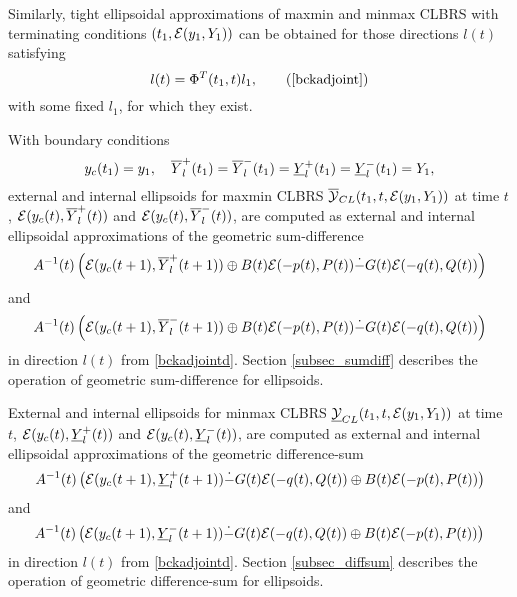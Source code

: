



Similarly, tight ellipsoidal approximations of maxmin and minmax CLBRS
with terminating conditions $(t_1, \EE(y_1,Y_1))$ can be obtained
for those directions $l(t)$ satisfying
\begin{equation}
l(t) = \Phi^T(t_1,t)l_1,
\tag*{(\ref{bckadjoint})}
\label{bckadjointd}
\end{equation}
with some fixed $l_1$, for which they exist.

With boundary conditions
\begin{equation}
y_c(t_1)=y_1, ~~~ \OYP(t_1)=\OYM(t_1)=\UYP(t_1)=\UYM(t_1)=Y_1,
\label{bndconds}
\end{equation}
external and internal ellipsoids for maxmin CLBRS $\OYCL(t_1,t,\EE(y_1,Y_1))$
at time $t$, $\EE(y_c(t),\OYP(t))$ and $\EE(y_c(t),\OYM(t))$, are computed
as external and internal ellipsoidal approximations of
the geometric sum-difference
\[ A^{-1}(t)\left(
\EE(y_c(t+1),\OYP(t+1)) \oplus B(t)\EE(-p(t),P(t))
\dot{-}G(t)\EE(-q(t),Q(t))
\right)\]
and
\[ A^{-1}(t)\left(
\EE(y_c(t+1),\OYM(t+1)) \oplus B(t)\EE(-p(t),P(t))
\dot{-}G(t)\EE(-q(t),Q(t))
\right)\]
in direction $l(t)$ from \ref{bckadjointd}.
Section \ref{subsec_sumdiff} describes the operation of
geometric sum-difference for ellipsoids.

External and internal ellipsoids for minmax CLBRS $\UYCL(t_1,t,\EE(y_1,Y_1))$
at time $t$, $\EE(y_c(t),\UYP(t))$ and $\EE(y_c(t),\UYM(t))$, are computed
as external and internal ellipsoidal approximations of
the geometric difference-sum
\[ A^{-1}(t)\left(
\EE(y_c(t+1),\UYP(t+1))
\dot{-}G(t)\EE(-q(t),Q(t))
\oplus B(t)\EE(-p(t),P(t))
\right)\]
and
\[ A^{-1}(t)\left(
\EE(y_c(t+1),\UYM(t+1))
\dot{-}G(t)\EE(-q(t),Q(t))
\oplus B(t)\EE(-p(t),P(t))
\right)\]
in direction $l(t)$ from \ref{bckadjointd}.
Section \ref{subsec_diffsum} describes the operation of
geometric difference-sum for ellipsoids.






